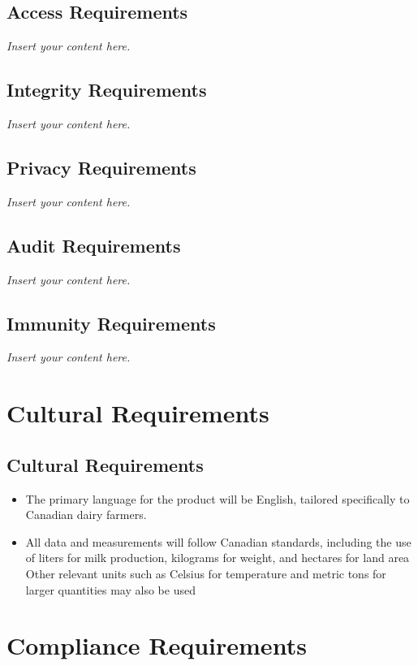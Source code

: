 \documentclass[12pt]{article}
\newcommand{\lips}{\textit{Insert your content here.}}
\begin{document}
\subsection{Access Requirements}
\lips
\subsection{Integrity Requirements}
\lips
\subsection{Privacy Requirements}
\lips
\subsection{Audit Requirements}
\lips
\subsection{Immunity Requirements}
\lips

\section{Cultural Requirements}
\subsection{Cultural Requirements}
\begin{itemize}
	\item The primary language for the product will be English, tailored
	      specifically to Canadian dairy farmers. 
	\item All data and measurements will follow Canadian standards, including the
	      use of liters for milk production, kilograms for weight, and hectares
	      for land area Other relevant units such as Celsius for temperature and
	      metric tons for larger quantities may also be used
\end{itemize}

\section{Compliance Requirements}
\end{document}
